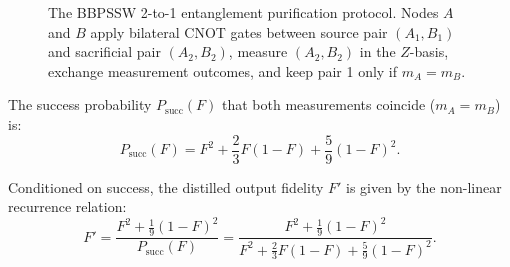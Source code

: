 \begin{figure}[htbp]
    \caption{The BBPSSW 2-to-1 entanglement purification protocol. Nodes $A$ and $B$ apply bilateral CNOT gates between source pair $(A_1, B_1)$ and sacrificial pair $(A_2, B_2)$, measure $(A_2, B_2)$ in the $Z$-basis, exchange measurement outcomes, and keep pair 1 only if $m_A = m_B$.}
    \label{fig:bbpssw_protocol_flow}
\end{figure}

The success probability $P_{\text{succ}}(F)$ that both measurements coincide ($m_A = m_B$) is:
\begin{equation}
    P_{\text{succ}}(F) = F^2 + \frac{2}{3} F(1 - F) + \frac{5}{9}(1 - F)^2.
    \label{eq:bbpssw_success_prob}
\end{equation}

Conditioned on success, the distilled output fidelity $F'$ is given by the non-linear recurrence relation:
\begin{equation}
    F' = \frac{F^2 + \frac{1}{9}(1 - F)^2}{P_{\text{succ}}(F)} = \frac{F^2 + \frac{1}{9}(1 - F)^2}{F^2 + \frac{2}{3} F(1 - F) + \frac{5}{9}(1 - F)^2}.
    \label{eq:bbpssw_fidelity_recurrence}
\end{equation}

